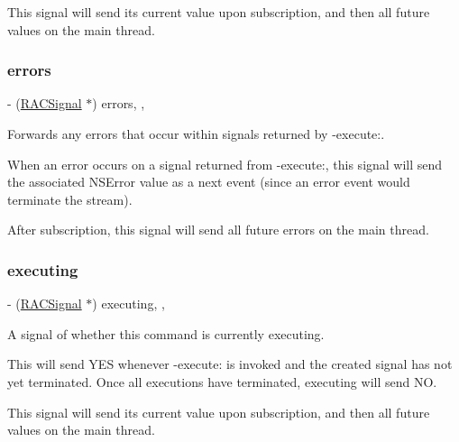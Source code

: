 This signal will send its current value upon subscription, and then all future values on the main thread. \mbox{\label{interface_r_a_c_command_a7bff8828bf8a855e9e4970dd56bc7bc3}} 
\subsubsection{\texorpdfstring{errors}{errors}}
{\footnotesize\ttfamily -\/ (\mbox{\hyperlink{interface_r_a_c_signal}{R\+A\+C\+Signal}} $\ast$) errors\hspace{0.3cm}{\ttfamily [read]}, {\ttfamily [nonatomic]}, {\ttfamily [strong]}}

Forwards any errors that occur within signals returned by -\/execute\+:.

When an error occurs on a signal returned from -\/execute\+:, this signal will send the associated N\+S\+Error value as a {\ttfamily next} event (since an {\ttfamily error} event would terminate the stream).

After subscription, this signal will send all future errors on the main thread. \mbox{\label{interface_r_a_c_command_a96244456fca773fa72936a8206a3b00b}} 
\subsubsection{\texorpdfstring{executing}{executing}}
{\footnotesize\ttfamily -\/ (\mbox{\hyperlink{interface_r_a_c_signal}{R\+A\+C\+Signal}} $\ast$) executing\hspace{0.3cm}{\ttfamily [read]}, {\ttfamily [nonatomic]}, {\ttfamily [strong]}}

A signal of whether this command is currently executing.

This will send Y\+ES whenever -\/execute\+: is invoked and the created signal has not yet terminated. Once all executions have terminated, {\ttfamily executing} will send NO.

This signal will send its current value upon subscription, and then all future values on the main thread. \mbox{\label{interface_r_a_c_command_aba3b25961f8dbe662cafa205bfe1370b}} 
